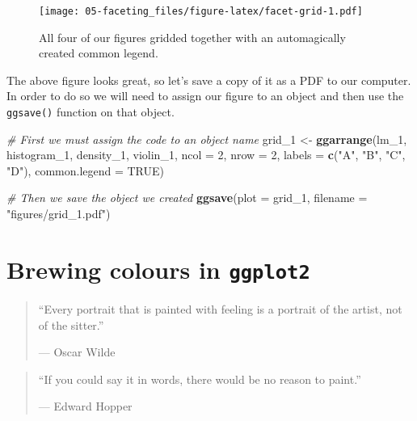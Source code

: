 \documentclass[]{book}
\newenvironment{Shaded}{\begin{snugshade}}{\end{snugshade}}
\newcommand{\KeywordTok}[1]{\textcolor[rgb]{0.13,0.29,0.53}{\textbf{#1}}}
\newcommand{\DataTypeTok}[1]{\textcolor[rgb]{0.13,0.29,0.53}{#1}}
\newcommand{\DecValTok}[1]{\textcolor[rgb]{0.00,0.00,0.81}{#1}}
\newcommand{\StringTok}[1]{\textcolor[rgb]{0.31,0.60,0.02}{#1}}
\newcommand{\CommentTok}[1]{\textcolor[rgb]{0.56,0.35,0.01}{\textit{#1}}}
\newcommand{\OtherTok}[1]{\textcolor[rgb]{0.56,0.35,0.01}{#1}}
\newcommand{\NormalTok}[1]{#1}
\theoremstyle{definition}
\theoremstyle{definition}
\theoremstyle{definition}
\theoremstyle{remark}
\begin{document}
\begin{figure}
\centering
\texttt{[image: 05-faceting\_files/figure-latex/facet-grid-1.pdf]}
\caption{\label{fig:facet-grid}All four of our figures gridded together with
an automagically created common legend.}
\end{figure}

The above figure looks great, so let's save a copy of it as a PDF to our
computer. In order to do so we will need to assign our figure to an
object and then use the \texttt{ggsave()} function on that object.

\begin{Shaded}
\begin{Highlighting}[]
\CommentTok{# First we must assign the code to an object name}
\NormalTok{grid_}\DecValTok{1}\NormalTok{ <-}\StringTok{ }\KeywordTok{ggarrange}\NormalTok{(lm_}\DecValTok{1}\NormalTok{, histogram_}\DecValTok{1}\NormalTok{, density_}\DecValTok{1}\NormalTok{, violin_}\DecValTok{1}\NormalTok{, }
                    \DataTypeTok{ncol =} \DecValTok{2}\NormalTok{, }\DataTypeTok{nrow =} \DecValTok{2}\NormalTok{, }
                    \DataTypeTok{labels =} \KeywordTok{c}\NormalTok{(}\StringTok{"A"}\NormalTok{, }\StringTok{"B"}\NormalTok{, }\StringTok{"C"}\NormalTok{, }\StringTok{"D"}\NormalTok{),}
                    \DataTypeTok{common.legend =} \OtherTok{TRUE}\NormalTok{)}

\CommentTok{# Then we save the object we created}
\KeywordTok{ggsave}\NormalTok{(}\DataTypeTok{plot =}\NormalTok{ grid_}\DecValTok{1}\NormalTok{, }\DataTypeTok{filename =} \StringTok{"figures/grid_1.pdf"}\NormalTok{)}
\end{Highlighting}
\end{Shaded}

\chapter{\texorpdfstring{Brewing colours in
\textbf{\texttt{ggplot2}}}{Brewing colours in ggplot2}}\label{brewing}

\begin{quote}
``Every portrait that is painted with feeling is a portrait of the
artist, not of the sitter.''

--- Oscar Wilde
\end{quote}

\begin{quote}
``If you could say it in words, there would be no reason to paint.''

--- Edward Hopper
\end{quote}
\end{document}
